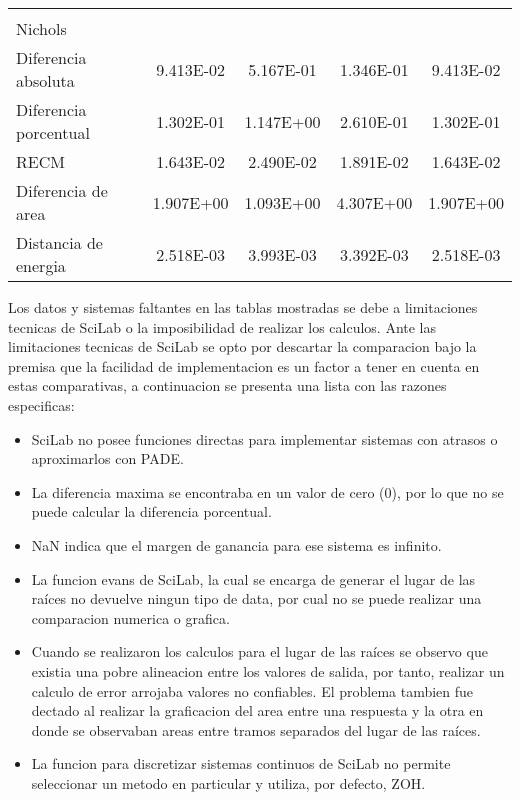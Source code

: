 {\begin{longtable}{l @{\extracolsep{\fill}} cccc}
            & & & & \\
            Nichols                & & & & \\ \cmidrule{1-1}
            Diferencia absoluta    & \num{9.413E-02} & \num{5.167E-01} & \num{1.346E-01} & \num{9.413E-02}  \\
            Diferencia porcentual  & \num{1.302E-01} & \num{1.147E+00} & \num{2.610E-01} & \num{1.302E-01}  \\
            RECM                   & \num{1.643E-02} & \num{2.490E-02} & \num{1.891E-02} & \num{1.643E-02}  \\
            Diferencia de area     & \num{1.907E+00} & \num{1.093E+00} & \num{4.307E+00} & \num{1.907E+00}  \\
            Distancia de energia   & \num{2.518E-03} & \num{3.993E-03} & \num{3.392E-03} & \num{2.518E-03}  \\  
            \bottomrule
        \end{longtable}}

        Los datos y sistemas faltantes en las tablas mostradas se debe a limitaciones tecnicas de SciLab o la imposibilidad de realizar los calculos. Ante las limitaciones tecnicas de SciLab se opto por descartar la comparacion bajo la premisa que la facilidad de implementacion es un factor a tener en cuenta en estas comparativas, a continuacion se presenta una lista con las razones especificas:

        \begin{itemize}[leftmargin=\parindent]
            \item SciLab no posee funciones directas para implementar sistemas con atrasos o aproximarlos con PADE.
            \item La diferencia maxima se encontraba en un valor de cero (0), por lo que no se puede calcular la diferencia porcentual.
            \item NaN indica que el margen de ganancia para ese sistema es infinito.
            \item La funcion evans de SciLab, la cual se encarga de generar el lugar de las raíces no devuelve ningun tipo de data, por cual no se puede realizar una comparacion numerica o grafica.
            \item Cuando se realizaron los calculos para el lugar de las raíces se observo que existia una pobre alineacion entre los valores de salida, por tanto, realizar un calculo de error arrojaba valores no confiables. El problema tambien fue dectado al realizar la graficacion del area entre una respuesta y la otra en donde se observaban areas entre tramos separados del lugar de las raíces.
            \item La funcion para discretizar sistemas continuos de SciLab no permite seleccionar un metodo en particular y utiliza, por defecto, ZOH.
        \end{itemize}

